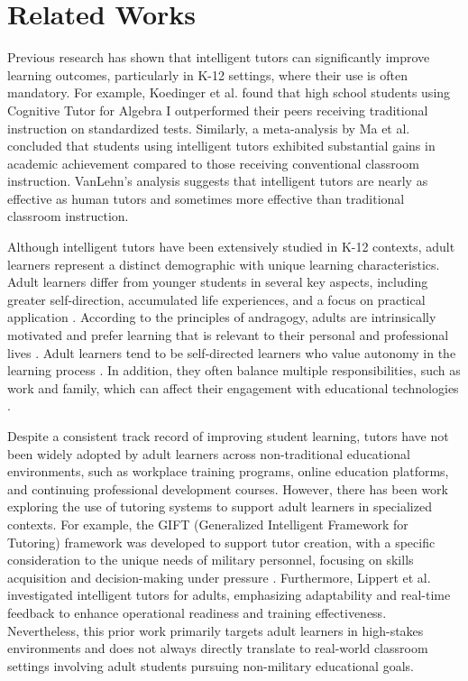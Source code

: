 \section{Related Works}
Previous research has shown that intelligent tutors can significantly improve learning outcomes, particularly in K-12 settings, where their use is often mandatory. For example, Koedinger et al. \cite{koedinger1997intelligent} found that high school students using Cognitive Tutor for Algebra I outperformed their peers receiving traditional instruction on standardized tests. Similarly, a meta-analysis by Ma et al. \cite{ma2014intelligent} concluded that students using intelligent tutors exhibited substantial gains in academic achievement compared to those receiving conventional classroom instruction. VanLehn's analysis \cite{vanlehn2011relative} suggests that intelligent tutors are nearly as effective as human tutors and sometimes more effective than traditional classroom instruction. 

Although intelligent tutors have been extensively studied in K-12 contexts, adult learners represent a distinct demographic with unique learning characteristics. Adult learners differ from younger students in several key aspects, including greater self-direction, accumulated life experiences, and a focus on practical application \cite{knowles1984adult,  knowles2015adult}. According to the principles of andragogy, adults are intrinsically motivated and prefer learning that is relevant to their personal and professional lives \cite{merriam2001andragogy, merriam2014adult}. Adult learners tend to be self-directed learners who value autonomy in the learning process \cite{garrison1997self, hiemstra2012reframing}. In addition, they often balance multiple responsibilities, such as work and family, which can affect their engagement with educational technologies \cite{cercone2008characteristics, brookfield2013powerful}.

Despite a consistent track record of improving student learning, tutors have not been widely adopted by adult learners across non-traditional educational environments, such as workplace training programs, online education platforms, and continuing professional development courses. However, there has been work exploring the use of tutoring systems to support adult learners in specialized contexts. For example, the GIFT (Generalized Intelligent  Framework for Tutoring) framework was developed to support tutor creation, with a specific consideration to the unique needs of military personnel, focusing on skills acquisition and decision-making under pressure \cite{Sinatra2014}. Furthermore, Lippert et al. \cite{lippert2020multiple} investigated intelligent tutors for adults, emphasizing adaptability and real-time feedback to enhance operational readiness and training effectiveness. Nevertheless, this prior work primarily targets adult learners in high-stakes environments and does not always directly translate to real-world classroom settings involving adult students pursuing non-military educational goals.

